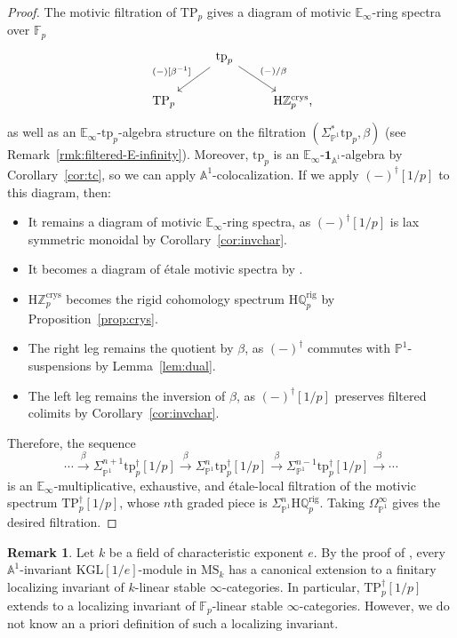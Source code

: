 \documentclass{amsart}
\numberwithin{equation}{section}
\theoremstyle{plain}
\theoremstyle{definition}
\newtheorem{remark}[equation]{Remark}
\let\bb=\mathbb
\def\Z{\bb Z}
\def\Q{\bb Q}
\def\F{\bb F}
\def\A{\bb A}
\def\P{\bb P}
\def\1{\mathbf 1}
\def\ph{\mathord-}
\def\HH{\mathrm{H}}
\def\E{\mathbb{E}}
\def\KGL{\mathrm{KGL}}
\def\MS{\mathrm{MS}}
\def\rig{\mathrm{rig}}
\newcommand{\TP}{\mathrm{TP}}
\newcommand{\crys}{\mathrm{crys}}
\newcommand{\tp}{\mathrm{tp}}
\begin{document}
\begin{proof}
The motivic filtration of $\TP_p$ gives a diagram of motivic $\E_\infty$-ring spectra over $\mathbb{F}_p$ 
\[
\begin{tikzcd}
	& \tp_p \ar[rd, "(\ph)/\beta"] \ar[ld, "{(\ph)[\beta^{-1}]}" swap] & \\
	\TP_p & & \HH\Z^\crys_p \rlap,
\end{tikzcd}
\]
as well as an $\E_\infty$-$\tp_p$-algebra structure on the filtration $(\Sigma_{\P^1}^*\tp_p,\beta)$ (see Remark~\ref{rmk:filtered-E-infinity}).
Moreover, $\tp_p$ is an $\E_\infty$-$\1_{\A^1}$-algebra by Corollary~\ref{cor:tc}, so we can apply $\A^1$-colocalization.
If we apply $(\ph)^\dagger[1/p]$ to this diagram, then:
\begin{itemize}
\item It remains a diagram of motivic $\E_\infty$-ring spectra, as $(\ph)^\dagger[1/p]$ is lax symmetric monoidal by Corollary~\ref{cor:invchar}.
\item It becomes a diagram of étale motivic spectra by \cite[Theorem~14.3.4]{CD}.
\item $\HH\Z^\crys_p$ becomes the rigid cohomology spectrum $\HH\Q^\rig_p$ by Proposition~\ref{prop:crys}.
\item The right leg remains the quotient by $\beta$, as $(\ph)^\dagger$ commutes with $\P^1$-suspensions by Lemma~\ref{lem:dual}.
\item The left leg remains the inversion of $\beta$, as $(\ph)^\dagger[1/p]$ preserves filtered colimits by Corollary~\ref{cor:invchar}.
\end{itemize}
Therefore, the sequence
\[
	\cdots \xrightarrow{\beta} \Sigma_{\P^1}^{n+1}\tp_p^\dagger[1/p]
	\xrightarrow{\beta} \Sigma_{\P^1}^n\tp_p^\dagger[1/p] 
	\xrightarrow{\beta} \Sigma_{\P^1}^{n-1}\tp_p^\dagger[1/p] \xrightarrow{\beta} \cdots
\]
is an $\E_\infty$-multiplicative, exhaustive, and étale-local filtration of the motivic spectrum $\TP_p^\dagger[1/p]$, whose $n$th graded piece is $\Sigma_{\P^1}^n\HH\Q_p^\rig$. Taking $\Omega^\infty_{\P^1}$ gives the desired filtration.
\end{proof}

\begin{remark}\label{rmk:robalo}
	Let $k$ be a field of characteristic exponent $e$. By the proof of \cite[Corollary~4.12]{Robalo}, every $\A^1$-invariant $\KGL[1/e]$-module in $\MS_{k}$ has a canonical extension to a finitary localizing invariant of $k$-linear stable $\infty$-categories.
	In particular, $\TP_p^\dagger[1/p]$ extends to a localizing invariant of $\F_p$-linear stable $\infty$-categories. However, we do not know an a priori definition of such a localizing invariant.
\end{remark}
\end{document}
